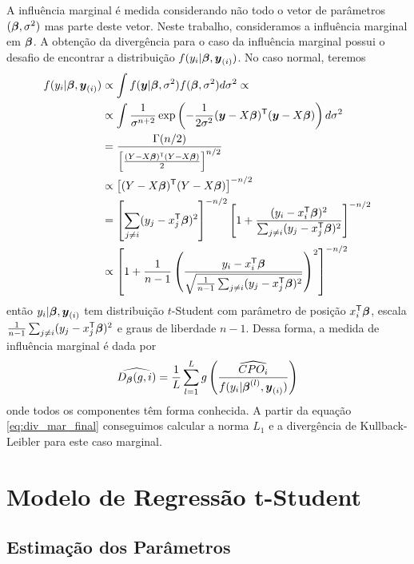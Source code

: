 A influência marginal é medida considerando não todo o vetor de parâmetros $({\boldsymbol{\beta}},\sigma^2)$ mas parte deste vetor. Neste trabalho, consideramos a influência marginal em ${\boldsymbol{\beta}}$. A obtenção da divergência para o caso da influência marginal possui o desafio de encontrar a distribuição $f(y_i|{\boldsymbol{\beta}},{\boldsymbol{y}_{(i)}})$. No caso normal, teremos
\begin{align*}
f(y_i|{\boldsymbol{\beta}},{\boldsymbol{y}_{(i)}}) & \propto \int f({\boldsymbol{y}}|{\boldsymbol{\beta}},\sigma^2)f({\boldsymbol{\beta}},\sigma^2)d\sigma^2 \propto \\
{} & \propto \int \frac{1}{\sigma^{n+2}}\exp\left(-\frac{1}{2\sigma^2}({\boldsymbol{y}}-X{\boldsymbol{\beta}})^{\mathsf{T}}({\boldsymbol{y}}-X{\boldsymbol{\beta}})\right) d\sigma^2 \\
{} & = \frac{\Gamma(n/2)}{\left[\frac{(Y-X{\boldsymbol{\beta}})^{\mathsf{T}}(Y-X{\boldsymbol{\beta}})}{2}\right]^{n/2}} \\
{} & \propto \left[(Y-X{\boldsymbol{\beta}})^{\mathsf{T}}(Y-X{\boldsymbol{\beta}})\right]^{-n/2} \\
{} & = \left[\sum_{j\neq i} (y_j-x_j^{\mathsf{T}}{\boldsymbol{\beta}})^2\right]^{-n/2} \left[1+\frac{(y_i-x_i^{\mathsf{T}}{\boldsymbol{\beta}})^2}{\sum_{j\neq i} (y_j-x_j^{\mathsf{T}}{\boldsymbol{\beta}})^2}\right]^{-n/2} \\
{} & \propto \left[1+\frac{1}{n-1}\left(\frac{y_i-x_i^{\mathsf{T}}{\boldsymbol{\beta}}}{\sqrt{\frac{1}{n-1}\sum_{j\neq i} (y_j-x_j^{\mathsf{T}}{\boldsymbol{\beta}})^2}}\right)^2\right]^{-n/2}
\end{align*}
então $y_i|{\boldsymbol{\beta}},{\boldsymbol{y}_{(i)}}$ tem distribuição $t$-Student com parâmetro de posição $x_i^{\mathsf{T}}{\boldsymbol{\beta}}$, escala \linebreak $\frac{1}{n-1}\sum_{j\neq i} (y_j-x_j^{\mathsf{T}}{\boldsymbol{\beta}})^2$ e graus de liberdade $n-1$. Dessa forma, a medida de influência marginal é dada por
\begin{equation}\label{eq:div_mar_final}
\widehat{D_{\boldsymbol{\beta}}(g,i)} = \frac{1}{L}\sum_{l=1}^L g\left(\frac{\widehat{CPO_i}}{f(y_i|{\boldsymbol{\beta}}^{(l)},{\boldsymbol{y}_{(i)}})}\right)
\end{equation}
onde todos os componentes têm forma conhecida. A partir da equação \eqref{eq:div_mar_final} conseguimos calcular a norma $L_1$ e a divergência de Kullback-Leibler para este caso marginal.

\section{Modelo de Regressão t-Student}
\label{sec:reg_t}

\subsection{Estimação dos Parâmetros}

